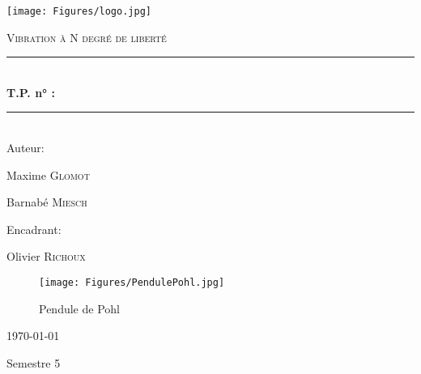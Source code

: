 \documentclass[10pt,a4paper, french]{article}
\newcommand{\HRule}{\rule{\linewidth}{0.5mm}}
\begin{document}
\begin{titlepage}
	\centering
	\texttt{[image: Figures/logo.jpg]}\par\vspace{1cm}

	\vspace{2cm}
	{\scshape\LARGE Vibration à N degré de liberté \par}
    \vspace{.5cm}
	\HRule \\[0.7cm]
	{\huge \bfseries T.P. n\si{\degree} : }\\[0.4cm]
	\HRule \\[1.5cm]
	\vspace{1.3cm}
	Auteur:\par
	{\large Maxime \textsc{Glomot}  \par
  \large Barnabé \textsc{Miesch}}
	\vspace{.4cm}

	Encadrant:\par
	{\large Olivier  \textsc{Richoux} } \\
	\vfill

	\begin{figure}[h]
        \centering
        \texttt{[image: Figures/PendulePohl.jpg]}
        \caption{Pendule de Pohl}
        \end{figure}
	{\large \today \par}
    Semestre 5 \\
\end{titlepage}

\newpage
\begin{center}
\renewcommand{\contentsname}{Sommaire}
\tableofcontents
\end{center}
\renewcommand*\listfigurename{Liste des Figures}
\listoffigures
\end{document}
